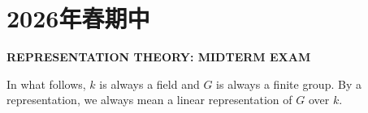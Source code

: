 
\section{2026年春期中}

\begin{center}
    \textbf{REPRESENTATION THEORY: MIDTERM EXAM}
\end{center}

In what follows, $k$ is always a field and $G$ is always a finite group. By a representation, we always mean a linear representation of $G$ over $k$.

